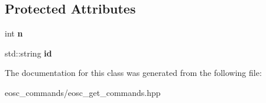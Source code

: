 \subsection*{Protected Attributes}
\begin{DoxyCompactItemize}
\item 
\mbox{\label{classtokenika_1_1eosc_1_1get__block__options_aa0c185f1cca1b55170b63064649e9984}} 
int {\bfseries n}
\item 
\mbox{\label{classtokenika_1_1eosc_1_1get__block__options_aefad040bfca5dbb07d27383fa0e0ee1f}} 
std\+::string {\bfseries id}
\end{DoxyCompactItemize}


The documentation for this class was generated from the following file\+:\begin{DoxyCompactItemize}
\item 
eosc\+\_\+commands/eosc\+\_\+get\+\_\+commands.\+hpp\end{DoxyCompactItemize}

